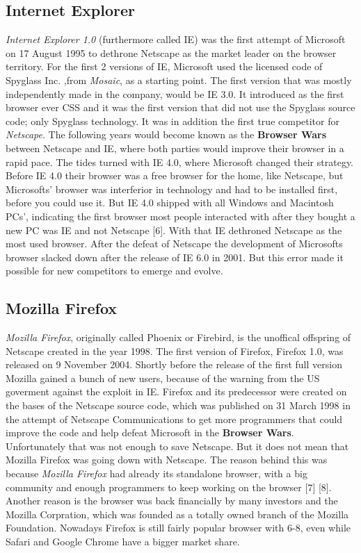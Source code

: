 \documentclass[runningheads]{llncs}
\begin{document}
		\subsection{Internet Explorer}
		\textit{Internet Explorer 1.0} (furthermore called IE) was the first attempt of Microsoft on 17 August 1995 to dethrone Netscape as the market leader on the browser territory. For the first 2 versions of IE, Microsoft used the licensed code of Spyglass Inc. ,from \textit{Mosaic}, as a starting point. The first version that was mostly independently made in the company, would be IE 3.0. It introduced as the first browser ever CSS and it was the first version that did not use the Spyglass source code; only Spyglass technology. It was in addition the first true competitor for \textit{Netscape}. The following years would become known as the \textbf{Browser Wars} between Netscape and IE, where both parties would improve their browser in a rapid pace. The tides turned with IE 4.0, where Microsoft changed their strategy. Before IE 4.0 their browser was a free browser for the home, like Netscape, but Microsofts' browser was interferior in technology and had to be installed first, before you could use it. But IE 4.0 shipped with all Windows and Macintosh PCs', indicating the first browser most people interacted with after they bought a new PC was IE and not Netscape [6]. With that IE dethroned Netscape as the most used browser. After the defeat of Netscape the development of Microsofts browser slacked down after the release of IE 6.0 in 2001. But this error made it possible for new competitors to emerge and evolve.
		\subsection{Mozilla Firefox}
		\textit{Mozilla Firefox}, originally called Phoenix or Firebird, is the unoffical offspring of Netscape created in the year 1998. The first version of Firefox, Firefox 1.0, was released on 9 November 2004. Shortly before the release of the first full version Mozilla gained a bunch of new users, because of the warning from the US goverment against the exploit in IE. Firefox and its predecessor were created on the bases of the Netscape source code, which was published on 31 March 1998 in the attempt of Netscape Communications to get more programmers that could improve the code and help defeat Microsoft in the \textbf{Browser Wars}. Unfortunately that was not enough to save Netscape. But it does not mean that Mozilla Firefox was going down with Netscape. The reason behind this was because \textit{Mozilla Firefox} had already its standalone browser, with a big community and enough  programmers  to keep working on the browser [7] [8]. Another reason is the browser was back financially by many investors and the Mozilla Corpration, which was founded as a totally owned branch of the Mozilla Foundation. Nowadays Firefox is still fairly popular browser with 6-8, even while Safari and Google Chrome have a bigger market share.
\end{document}
